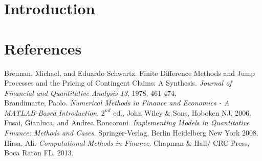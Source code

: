 \documentclass[a4paper,12pt]{article}
\begin{document}
\tableofcontents

\newpage
{}      %
\setcounter{page}{1}        %




\section{Introduction}

\section{References}

Brennan, Michael, and Eduardo Schwartz. Finite Difference Methods and Jump Processes and the Pricing of Contingent Claims: A Synthesis. \textit{Journal of Financial and Quantitative Analysis 13}, 1978, 461-474.\\

Brandimarte, Paolo. \textit{Numerical Methods in Finance and Economics - A MATLAB-Based Introduction}, $2^{nd}$ ed., John Wiley \& Sons, Hoboken NJ, 2006.\\

Fusai, Gianluca, and Andrea Roncoroni. \textit{Implementing Models in Quantitative Finance: Methods and Cases.} Springer-Verlag, Berlin Heidelberg New York 2008.\\

Hirsa, Ali. \textit{Computational Methods in Finance}. Chapman \& Hall/ CRC Press, Boca Raton FL, 2013.
\end{document}
